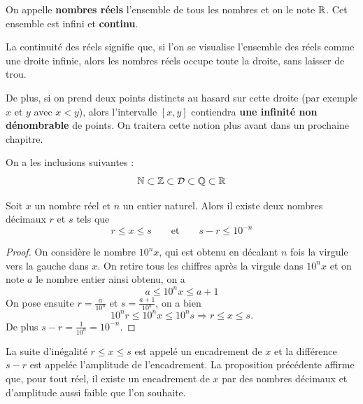 \documentclass[a4paper, 12pt]{report}
\begin{document}
\begin{defn}
On appelle \textbf{nombres réels} l'ensemble de tous les nombres et on le note $\mathbb{R}$. Cet ensemble est infini et \textbf{continu}.
\end{defn}

La continuité des réels signifie que, si l'on se visualise l'ensemble des réels comme une droite infinie, alors les nombres réels occupe toute la droite, sans laisser de trou.

\begin{center}
\end{center}

De plus, si on prend deux points distincts au hasard sur cette droite (par exemple $x$ et $y$ avec $x<y$), alors l'intervalle $[x,y]$ contiendra \textbf{une infinité non dénombrable} de points. On traitera cette notion plus avant dans un prochaine chapitre.

\begin{rmq}
On a les inclusions suivantes :
\[ \mathbb{N} \subset \mathbb{Z} \subset \mathcal{D} \subset \mathbb{Q} \subset \mathbb{R} \]
\end{rmq}

\begin{thm}
Soit $x$ un nombre réel et $n$ un entier naturel. 
Alors il existe deux nombres décimaux $r$ et $s$ tels que
\[ r \leq x \leq s \qquad \text{et} \qquad s-r \leq 10^{-n} \]
\end{thm}

\begin{proof}
On considère le nombre $10^n x$, qui est obtenu en décalant $n$ fois la virgule vers la gauche dans $x$. 
On retire tous les chiffres après la virgule dans $10^n x$ et on note $a$ le nombre entier ainsi obtenu, on a
\[ a \leq 10^n x \leq a+1 \]
On pose ensuite $r = \frac{a}{10^n}$ et $s =\frac{a+1}{10^n}$, on a bien
\[ 10^n r \leq 10^n x \leq 10^n s \Rightarrow r \leq x \leq s . \]
De plus $s-r = \frac{1}{10^n} = 10^{-n}$. 
\end{proof}

\begin{rmq}
La suite d'inégalité $r \leq x \leq s$ est appelé un encadrement de $x$ et la différence $s-r$ est appelée l'amplitude de l'encadrement. 
La proposition précédente affirme que, pour tout réel, il existe un encadrement de $x$ par des nombres décimaux et d'amplitude aussi faible que l'on souhaite.
\end{rmq}
\end{document}
